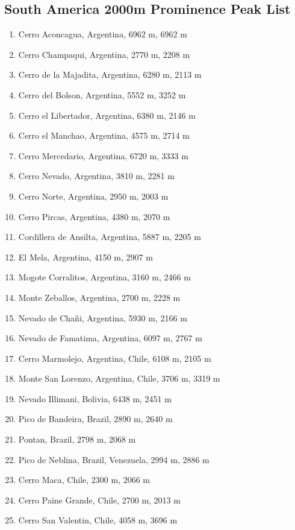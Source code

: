\documentclass[10pt,twocolumn,letterpaper]{article}
\begin{document}
\subsection{South America 2000m Prominence Peak List}
\begin{flushleft}
\begin{enumerate}
    \item Cerro Aconcagua, Argentina, 6962 m, 6962 m
    \item Cerro Champaqui, Argentina, 2770 m, 2208 m
    \item Cerro de la Majadita, Argentina, 6280 m, 2113 m
    \item Cerro del Bolson, Argentina, 5552 m, 3252 m
    \item Cerro el Libertador, Argentina, 6380 m, 2146 m
    \item Cerro el Manchao, Argentina, 4575 m, 2714 m
    \item Cerro Mercedario, Argentina, 6720 m, 3333 m
    \item Cerro Nevado, Argentina, 3810 m, 2281 m
    \item Cerro Norte, Argentina, 2950 m, 2003 m
    \item Cerro Pircas, Argentina, 4380 m, 2070 m
    \item Cordillera de Ansilta, Argentina, 5887 m, 2205 m
    \item El Mela, Argentina, 4150 m, 2907 m
    \item Mogote Corralitos, Argentina, 3160 m, 2466 m
    \item Monte Zeballos, Argentina, 2700 m, 2228 m
    \item Nevado de Chañi, Argentina, 5930 m, 2166 m
    \item Nevado de Famatima, Argentina, 6097 m, 2767 m
    \item Cerro Marmolejo, Argentina, Chile, 6108 m, 2105 m
    \item Monte San Lorenzo, Argentina, Chile, 3706 m, 3319 m
    \item Nevado Illimani, Bolivia, 6438 m, 2451 m
    \item Pico de Bandeira, Brazil, 2890 m, 2640 m
    \item Pontan, Brazil, 2798 m, 2068 m
    \item Pico de Neblina, Brazil, Venezuela, 2994 m, 2886 m
    \item Cerro Maca, Chile, 2300 m, 2066 m
    \item Cerro Paine Grande, Chile, 2700 m, 2013 m
    \item Cerro San Valentin, Chile, 4058 m, 3696 m

\end{enumerate}
\end{flushleft}
\end{document}
